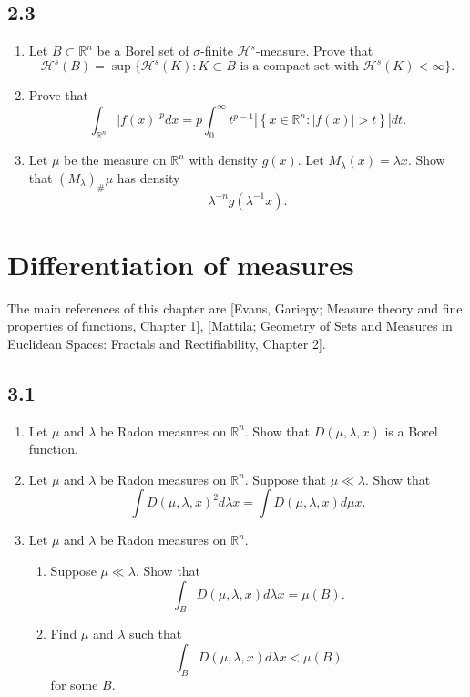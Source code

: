 \subsection*{2.3}
\begin{enumerate}
    \item Let $B \subset \mathbb{R}^{n}$ be a Borel set of $\sigma$-finite $\mathcal{H}^{s}$-measure. Prove that
    $$\mathcal{H}^{s}(B)=\sup \{\mathcal{H}^{s}(K): K \subset B \text { is a compact set with } \mathcal{H}^{s}(K)<\infty\}.$$
    \item Prove that
    $$\int_{\mathbb{R}^{n}}|f(x)|^{p} d x
    =p \int_{0}^{\infty} t^{p-1}\left|\left\{x \in \mathbb{R}^{n}:|f(x)|>t\right\}\right| dt.$$
    \item Let $\mu$ be the measure on $\mathbb{R}^{n}$ with density $g(x)$. 
    Let $M_{\lambda}(x)=\lambda x$. Show that $(M_{\lambda})_\# \mu$ has density
    $$\lambda^{-n} g(\lambda^{-1} x).$$
\end{enumerate}

\section{Differentiation of measures}

The main references of this chapter are [Evans, Gariepy; Measure theory and fine properties of functions, Chapter 1], 
[Mattila; Geometry of Sets and Measures in Euclidean Spaces: Fractals and Rectifiability, Chapter 2].

\subsection*{3.1}
\begin{enumerate}
    \item Let $\mu$ and $\lambda$ be Radon measures on $\mathbb{R}^{n}$. 
    Show that $D(\mu, \lambda, x)$ is a Borel function.
    \item Let $\mu$ and $\lambda$ be Radon measures on $\mathbb{R}^{n}$. 
    Suppose that $\mu \ll \lambda$. Show that
    $$\int D(\mu, \lambda, x)^{2} d \lambda x=\int D(\mu, \lambda, x) d \mu x.$$
    \item Let $\mu$ and $\lambda$ be Radon measures on $\mathbb{R}^{n}$.
    \begin{enumerate}[label=(\roman*)]
    \item Suppose $\mu \ll \lambda$. Show that
    $$\int_{B} D(\mu, \lambda, x) d \lambda x=\mu(B).$$
    \item Find $\mu$ and $\lambda$ such that
    $$\int_{B} D(\mu, \lambda, x) d \lambda x<\mu(B)$$
    for some $B$.
    \end{enumerate}
\end{enumerate}

